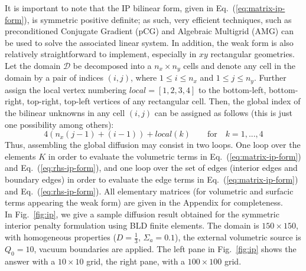 \documentclass{mc2013}
\newcommand\mc{\mathcal}
\renewcommand{\(}{\left(}
\renewcommand{\)}{\right)}
\renewcommand{\[}{\left[}
\renewcommand{\]}{\right]}
\newcommand{\eqt}[1]{Eq.~(\ref{#1})}                     %
\newcommand{\fig}[1]{Fig.~\ref{#1}}                      %
\begin{document}
It is important to note that the IP bilinear form, given in \eqt{eq:matrix-ip-form}, is symmetric positive definite; 
as such, very efficient techniques, such as preconditioned Conjugate Gradient (pCG) and Algebraic Multigrid (AMG) can
be used to solve the associated linear system. In addition, the weak form is also relatively straightforward to implement,
especially in $xy$ rectangular geometries. Let the domain $\mc{D}$ be decomposed into a $n_x \times n_y$ cells 
and denote any cell in the domain by a pair of indices $(i,j)$, where 
$1 \le i \le n_x$ and $1 \le j \le n_y$. Further assign the local vertex numbering $local=[1,2,3,4]$ to the
bottom-left, bottom-right, top-right, top-left vertices of any rectangular cell. Then, the global index of
the bilinear unknowns in any cell $(i,j)$ can be assigned as follows (this is just one possibility among others):
\begin{equation}
4\left( n_x(j-1)+(i-1) \right) +local(k) \qquad \text{for} \quad k =1, ..., 4
\end{equation}
Thus, assembling the global diffusion may consist in two loops. One loop over the elements $K$ in order to evaluate 
the volumetric terms in \eqt{eq:matrix-ip-form} and \eqt{eq:rhs-ip-form}, and one loop over the set of edges 
(interior edges and boundary edges) in order to evaluate the edge terms in \eqt{eq:matrix-ip-form} and \eqt{eq:rhs-ip-form}.
All elementary matrices (for volumetric and surfacic terms appearing the weak form) are 
given in the Appendix for completeness.\\
%
In \fig{fig:ip}, we give a sample diffusion result obtained for the symmetric interior penalty formulation using BLD finite elements. The domain is 
$150 \times 150$, with homogeneous properties ($D=\tfrac 1 3$, $\Sigma_a=0.1$), the external volumetric source is $Q_0=10$, vacuum boundaries are applied.
The left pane in \fig{fig:ip} shows the answer with a $10\times 10$ grid, the right pane, with a $100 \times 100$ grid.
\end{document}
